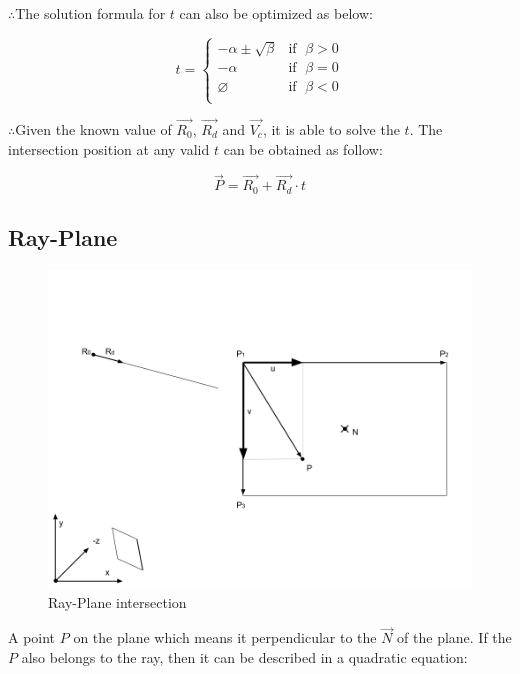 $\therefore$\;\;\;\;The solution formula for $t$ can also be optimized as below:

\[
t =
\begin{cases}
 -\alpha \pm \sqrt{\beta} & \text{if }\;\beta > 0\\
-\alpha & \text{if }\;\beta = 0\\
\varnothing & \text{if }\;\beta < 0\\
\end{cases}
\]

$\therefore$\;\;\;\;Given the known value of $\overrightarrow{R_0}$, $\overrightarrow{R_d}$ and $\overrightarrow{V_c}$, it is able to solve the $t$. The intersection position at any valid $t$ can be obtained as follow:

\[
\overrightarrow{P} = \overrightarrow{R_0} + \overrightarrow{R_d} \cdot t
\]

\subsection{Ray-Plane}

\begin{figure}[H]
\caption{Ray-Plane intersection}
\label{fig:ray-plane}
\centering
\includegraphics[width=\textwidth, keepaspectratio]{Figures/ray-plane-intersection.png}
\decoRule
\end{figure}

A point $P$ on the plane which means it perpendicular to the $\overrightarrow{N}$ of the plane. If the $P$ also belongs to the ray, then it can be described in a quadratic equation:

